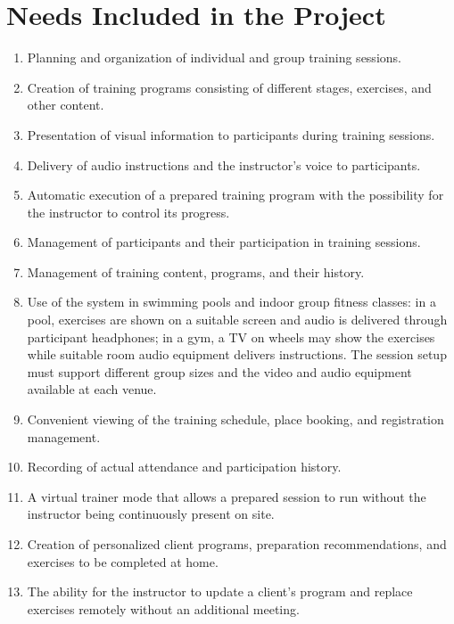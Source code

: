 \documentclass[a4paper,11pt]{article}
\begin{document}
\section{Needs Included in the Project}
\begin{enumerate}[label=\arabic*.]
\item Planning and organization of individual and group training sessions.
\item Creation of training programs consisting of different stages, exercises, and other content.
\item Presentation of visual information to participants during training sessions.
\item Delivery of audio instructions and the instructor's voice to participants.
\item Automatic execution of a prepared training program with the possibility for the instructor to control its progress.
\item Management of participants and their participation in training sessions.
\item Management of training content, programs, and their history.
\item Use of the system in swimming pools and indoor group fitness classes: in a pool, exercises are shown on a suitable screen and audio is delivered through participant headphones; in a gym, a TV on wheels may show the exercises while suitable room audio equipment delivers instructions. The session setup must support different group sizes and the video and audio equipment available at each venue.
\item Convenient viewing of the training schedule, place booking, and registration management.
\item Recording of actual attendance and participation history.
\item A virtual trainer mode that allows a prepared session to run without the instructor being continuously present on site.
\item Creation of personalized client programs, preparation recommendations, and exercises to be completed at home.
\item The ability for the instructor to update a client's program and replace exercises remotely without an additional meeting.
\end{enumerate}
\end{document}
